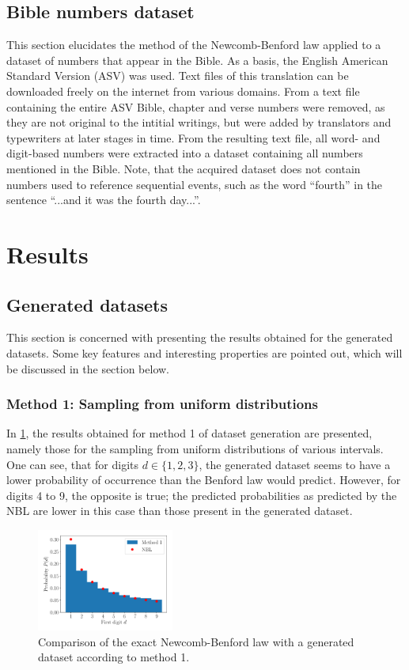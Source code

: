 \documentclass[a4paper,10pt, twocolumn]{article}
\begin{document}
\subsection{Bible numbers dataset}
This section elucidates the method of the Newcomb-Benford law applied to a dataset of numbers that appear in the Bible. As a basis, the English American Standard Version (ASV) was used. Text files of this translation can be downloaded freely on the internet from various domains. From a text file containing the entire ASV Bible, chapter and verse numbers were removed, as they are not original to the intitial writings, but were added by translators and typewriters at later stages in time. From the resulting text file, all word- and digit-based numbers were extracted into a dataset containing all numbers mentioned in the Bible. Note, that the acquired dataset does not contain numbers used to reference sequential events, such as the word ``fourth'' in the sentence ``...and it was the fourth day...''.


\section{Results}
\subsection{Generated datasets}
This section is concerned with presenting the results obtained for the generated datasets. Some key features and interesting properties are pointed out, which will be discussed in the section below.

\subsubsection{Method 1: Sampling from uniform distributions}
In \cref{fig:gen_method_1}, the results obtained for method 1 of dataset generation are presented, namely those for the sampling from uniform distributions of various intervals. One can see, that for digits $d \in \{1,2,3\}$, the generated dataset seems to have a lower probability of occurrence than the Benford law would predict. However, for digits 4 to 9, the opposite is true; the predicted probabilities as predicted by the NBL are lower in this case than those present in the generated dataset.
\begin{figure}[h]
	\centering
	\includegraphics[width=0.4\textwidth]{figures/gen_method_1.pdf}
	\caption{Comparison of the exact Newcomb-Benford law with a generated dataset according to method 1.}
	\label{fig:gen_method_1}
\end{figure}
\end{document}
